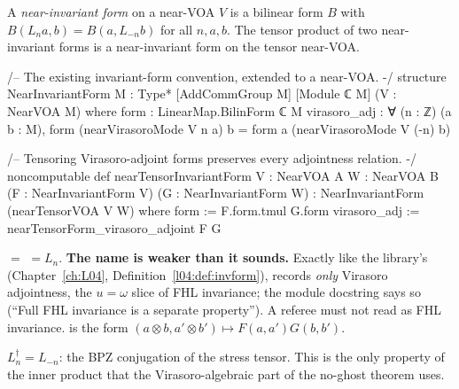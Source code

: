 \begin{definition}\label{ch17:def:nearform}
A \emph{near-invariant form} on a near-VOA $V$ is a bilinear form $B$ with $B(L_na,b)=B(a,L_{-n}b)$ for all $n,a,b$.
The tensor product of two near-invariant forms is a near-invariant form on the tensor near-VOA.
\end{definition}

\begin{leancode}
/-- The existing invariant-form convention, extended to a near-VOA. -/
structure NearInvariantForm {M : Type*} [AddCommGroup M] [Module ℂ M] (V : NearVOA M) where
  form : LinearMap.BilinForm ℂ M
  virasoro_adj : ∀ (n : ℤ) (a b : M),
    form (nearVirasoroMode V n a) b = form a (nearVirasoroMode V (-n) b)

/-- Tensoring Virasoro-adjoint forms preserves every adjointness relation. -/
noncomputable def nearTensorInvariantForm {V : NearVOA A} {W : NearVOA B}
    (F : NearInvariantForm V) (G : NearInvariantForm W) : NearInvariantForm (nearTensorVOA V W) where
  form := F.form.tmul G.form
  virasoro_adj := nearTensorForm_virasoro_adjoint F G
\end{leancode}

\begin{dictionary}
 $=$  $=L_n$.  \textbf{The name is weaker than it
sounds.} Exactly like the library's  (Chapter~\ref{ch:L04},
Definition~\ref{l04:def:invform}),  records \emph{only} Virasoro adjointness, the $u=\omega$ slice
of FHL invariance; the module docstring says so (``Full FHL invariance is a separate property'').  A referee
must not read  as FHL invariance.   is the form
$(a\otimes b,a'\otimes b')\mapsto F(a,a')G(b,b')$.
\end{dictionary}

\begin{physics}
$L_n^\dagger=L_{-n}$: the BPZ conjugation of the stress tensor.  This is the only property of the inner product
that the Virasoro-algebraic part of the no-ghost theorem uses.
\end{physics}

